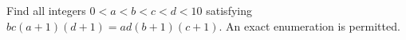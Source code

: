 Find all integers $0<a<b<c<d<10$ satisfying $bc(a+1)(d+1)=ad(b+1)(c+1)$. An exact enumeration is permitted.
